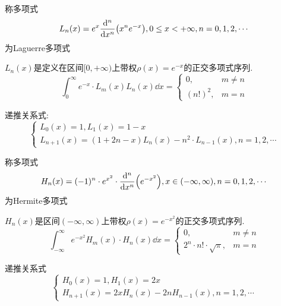 \begin{definition}[Laguerre多项式]
    称多项式
    \begin{equation*}
        L_n(x)=e^x\dv[n]{x}(x^ne^{-x}), 0\le x<+\infty, n=0,1,2,\cdots
    \end{equation*}
    为Laguerre多项式
\end{definition}

${L_n(x)}$是定义在区间$[0,+\infty)$上带权$\rho(x)=e^{-x}$的正交多项式序列.
\begin{equation*}
    \int_0^\infty e^{-x}\cdot L_m(x)L_n(x)\dd{x}=
    \begin{cases}
        0,&m\ne n\\
        (n!)^2,& m=n
    \end{cases}
\end{equation*}

递推关系式:
\begin{equation*}
    \begin{cases}
        L_0(x)=1, L_1(x)=1-x\\
        L_{n+1}(x)=(1+2n-x)L_n(x)-n^2\cdot L_{n-1}(x), n=1,2,\cdots
    \end{cases}
\end{equation*}

\begin{definition}[Hermite多项式]
    称多项式
    \begin{equation*}
        H_n(x)=(-1)^n\cdot e^{x^2}\cdot\dv[n]{x}(e^{-x^2}), x\in(-\infty, \infty), n=0,1,2,\cdots
    \end{equation*}
    为Hermite多项式
\end{definition}

${H_n(x)}$是区间$(-\infty, \infty)$上带权$\rho(x)=e^{-x^2}$的正交多项式序列.
\begin{equation*}
    \int_{-\infty}^\infty e^{-x^2}H_m(x)\cdot H_n(x)\dd{x}=
    \begin{cases}
        0, &m\ne n\\
        2^n\cdot n!\cdot\sqrt{\pi},& m=n
    \end{cases}
\end{equation*}

递推关系式
\begin{equation*}
    \begin{cases}
        H_0(x)=1, H_1(x)=2x\\
        H_{n+1}(x)=2xH_n(x)-2nH_{n-1}(x), n=1,2,\cdots
    \end{cases}
\end{equation*}